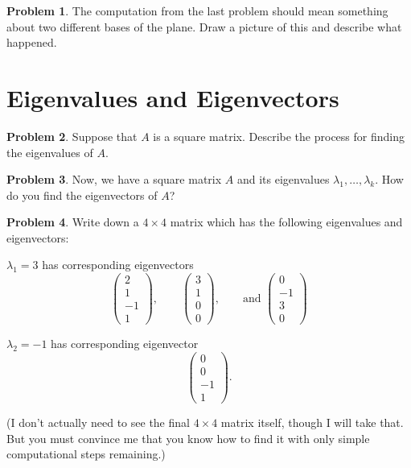 \documentclass[11pt]{amsart}
\theoremstyle{definition}
\newtheorem{problem}{Problem}[section]
\begin{document}
\begin{problem}
The computation from the last problem should mean something about two different bases of the plane. Draw a picture of this and describe what happened.
\end{problem}

\vspace{1cm}
\section{Eigenvalues and Eigenvectors}

\begin{problem}
Suppose that $A$ is a square matrix. Describe the process for finding the eigenvalues of $A$.
\end{problem}

\begin{problem}
Now, we have a square matrix $A$ and its eigenvalues $\lambda_1, \ldots, \lambda_k$.
How do you find the eigenvectors of $A$?
\end{problem}

\begin{problem}
Write down a $4\times 4$ matrix which has the following eigenvalues and eigenvectors:
\begin{compactitem}
\item $\lambda_1 = 3$ has corresponding eigenvectors
\[
\begin{pmatrix} 2 \\ 1\\ -1\\ 1 \end{pmatrix}, \qquad \begin{pmatrix} 3\\ 1\\ 0\\0 \end{pmatrix}, \qquad \text{and } \begin{pmatrix} 0\\ -1\\ 3\\ 0 \end{pmatrix}
\]
\item $\lambda_2 = -1$ has corresponding eigenvector
\[
\begin{pmatrix} 0 \\ 0 \\ -1 \\ 1 \end{pmatrix}.
\]
\end{compactitem}
(I don't actually need to see the final $4\times 4$ matrix itself, though I will take that. But you must convince me that you know how to find it with only simple computational steps remaining.)
\end{problem}
\end{document}
